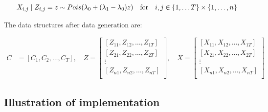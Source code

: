 \begin{align*}
    X_{i,j} \mid Z_{i,j} = z \sim Pois( \lambda_0 + (\lambda_1-\lambda_0)z ) \quad \text{for}\quad i,j \in \{1,\ldots T\}\times \{1,\ldots, n\}
\end{align*}

The data structures after data generation are:

\begin{align*}
    C &= [C_1, C_2, \ldots, C_T],\quad     Z = \begin{bmatrix}
        [Z_{11}, Z_{12}, \ldots, Z_{1T}]\\
        [Z_{21}, Z_{22}, \ldots, Z_{2T}]\\
        \vdots\\
        [Z_{n1}, Z_{n2}, \ldots, Z_{nT}]\\
    \end{bmatrix}, \quad X = \begin{bmatrix}
        [X_{11}, X_{12}, \ldots, X_{1T}]\\
        [X_{21}, X_{22}, \ldots, X_{2T}]\\
        \vdots\\
        [X_{n1}, X_{n2}, \ldots, X_{nT}]\\
    \end{bmatrix}
\end{align*}








\subsection{Illustration of implementation}

